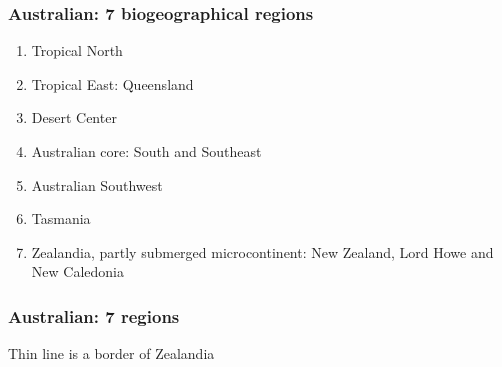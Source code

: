 \documentclass{beamer}
\newcommand{\Max}[1]{\texttt{[image: \#1]}}
\begin{document}

\begin{frame}
\frametitle{Australian: 7 biogeographical regions}

\begin{enumerate}

\item Tropical North

\item Tropical East: Queensland

\item Desert Center

\item Australian core: South and Southeast

\item Australian Southwest

\item Tasmania

\item Zealandia, partly submerged microcontinent: New Zealand, Lord Howe and New Caledonia

\end{enumerate}

\end{frame}


\begin{frame}
\frametitle{Australian: 7 regions}

\centering


\tiny Thin line is a border of Zealandia

\end{frame}

\end{document}
